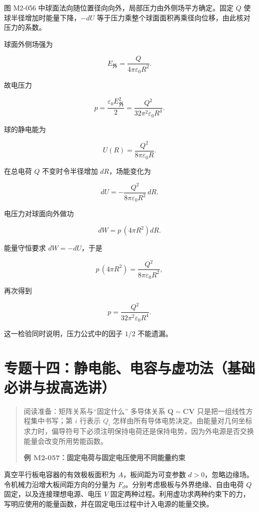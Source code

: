 图 M2-056 中球面法向随位置径向向外，局部压力由外侧场平方确定。固定 \(Q\)
使球半径增加时能量下降，\(-dU\)
等于压力乘整个球面面积再乘径向位移，由此核对压力的系数。

球面外侧场强为

\[
E_{\text{外}}=\frac{Q}{4\pi\varepsilon_0R^2}.
\]

故电压力

\[
p=\frac{\varepsilon_0E_{\text{外}}^2}{2}
=\boxed{\frac{Q^2}{32\pi^2\varepsilon_0R^4}}.
\]

球的静电能为

\[
U(R)=\frac{Q^2}{8\pi\varepsilon_0R}.
\]

在总电荷 \(Q\) 不变时令半径增加 \(dR\)，场能变化为

\[
dU=-\frac{Q^2}{8\pi\varepsilon_0R^2}\,dR.
\]

电压力对球面向外做功

\[
dW=p\,(4\pi R^2)dR.
\]

能量守恒要求 \(dW=-dU\)，于是

\[
p\,(4\pi R^2)
=\frac{Q^2}{8\pi\varepsilon_0R^2},
\]

再次得到

\[
p=\frac{Q^2}{32\pi^2\varepsilon_0R^4}.
\]

这一检验同时说明，压力公式中的因子 \(1/2\) 不能遗漏。

\section{专题十四：静电能、电容与虚功法（基础必讲与拔高选讲）}\label{m2:ux4e13ux9898ux5341ux56dbux9759ux7535ux80fdux7535ux5bb9ux4e0eux865aux529fux6cd5ux57faux7840ux5fc5ux8bb2ux4e0eux62d4ux9ad8ux9009ux8bb2}

\begin{quote}
阅读准备：矩阵关系与``固定什么'' 多导体关系
\(\mathbf Q=\mathbf C\mathbf V\) 只是把一组线性方程集中书写；第 \(i\)
行表示 \(Q_i\)
怎样由所有导体电势决定。由能量对几何坐标求力时，偏导符号下必须注明保持电荷还是保持电势，因为外电源是否交换能量会改变所用势能函数。

\textbf{例 M2-057：固定电荷与固定电压使用不同能量约束}
\end{quote}

真空平行板电容器的有效极板面积为 \(A\)，板间距为可变参数
\(d>0\)，忽略边缘场。令机械力沿增大板间距方向的分量为
\(F_d\)。分别考虑极板与外界绝缘、自由电荷 \(Q\)
固定，以及连接理想电源、电压 \(V\)
固定两种过程。利用虚功求两种约束下的力，写明应使用的能量函数，并在固定电压过程中计入电源的能量交换。

